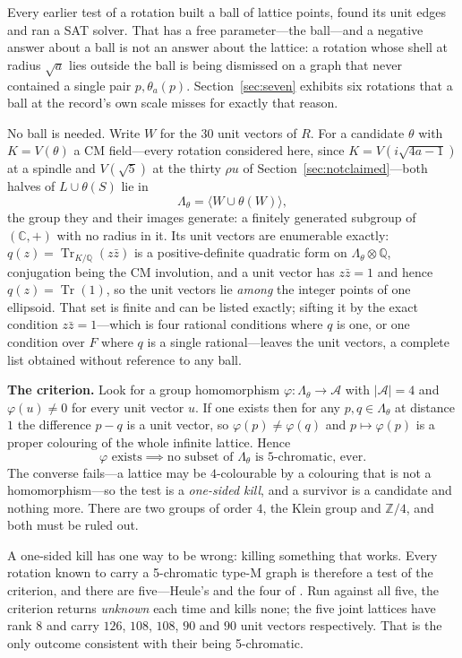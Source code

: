 \documentclass[11pt,reqno]{amsart}
\theoremstyle{plain}
\theoremstyle{definition}
\newcommand{\Z}{\mathbb{Z}}
\newcommand{\Q}{\mathbb{Q}}
\newcommand{\C}{\mathbb{C}}
\newcommand{\Lat}{R}
\newcommand{\Lam}{\Lambda}
\DeclareMathOperator{\Tr}{Tr}
\begin{document}
Every earlier test of a rotation built a ball of lattice points, found its unit
edges and ran a SAT solver. That has a free parameter---the ball---and a negative
answer about a ball is not an answer about the lattice: a rotation whose shell at
radius $\sqrt a$ lies outside the ball is being dismissed on a graph that never
contained a single pair $p, \theta_a(p)$. Section~\ref{sec:seven} exhibits six
rotations that a ball at the record's own scale misses for exactly that reason.

No ball is needed. Write $W$ for the $30$ unit vectors of $\Lat$. For a candidate
$\theta$ with $K = V(\theta)$ a CM field---every rotation considered here, since
$K = V(i\sqrt{4a-1})$ at a spindle and $V(\sqrt5)$ at the thirty $\rho u$ of
Section~\ref{sec:notclaimed}---both halves of $L \cup \theta(S)$ lie in
\[
  \Lam_\theta = \langle W \cup \theta(W) \rangle,
\]
the group they and their images generate: a finitely generated subgroup of
$(\C,+)$ with no radius in it. Its unit vectors are enumerable exactly:
$q(z) = \Tr_{K/\Q}(z\bar z)$ is a positive-definite quadratic form on
$\Lam_\theta \otimes \Q$, conjugation being the CM involution, and a unit vector
has $z\bar z = 1$ and hence $q(z) = \Tr(1)$, so the unit vectors lie \emph{among} the integer points of one
ellipsoid. That set is finite and can be listed exactly; sifting it by the exact
condition $z\bar z = 1$---which is four rational conditions where $q$ is one, or
one condition over $F$ where $q$ is a single rational---leaves the
unit vectors, a complete list obtained without reference to any ball.

\medskip
\noindent\textbf{The criterion.} Look for a group homomorphism
$\varphi : \Lam_\theta \to \mathcal{A}$ with $\lvert \mathcal{A} \rvert = 4$ and $\varphi(u) \ne 0$
for every unit vector $u$. If one exists then for any $p,q \in \Lam_\theta$ at
distance $1$ the difference $p-q$ is a unit vector, so $\varphi(p) \ne \varphi(q)$
and $p \mapsto \varphi(p)$ is a proper colouring of the whole infinite lattice.
Hence
\[
  \varphi \text{ exists} \implies \text{no subset of } \Lam_\theta \text{ is 5-chromatic, ever.}
\]
The converse fails---a lattice may be $4$-colourable by a colouring that is not a
homomorphism---so the test is a \emph{one-sided kill}, and a survivor is a
candidate and nothing more. There are two groups of order $4$, the Klein group and
$\Z/4$, and both must be ruled out.

A one-sided kill has one way to be wrong: killing something that works. Every
rotation known to carry a 5-chromatic type-M graph is therefore a test of the
criterion, and there are five---Heule's and the four of \cite{Voronov}. Run
against all five, the criterion returns \emph{unknown} each time and kills none;
the five joint lattices have rank $8$ and carry $126$, $108$, $108$, $90$ and
$90$ unit vectors respectively. That is the only outcome consistent with their
being 5-chromatic.
\end{document}
